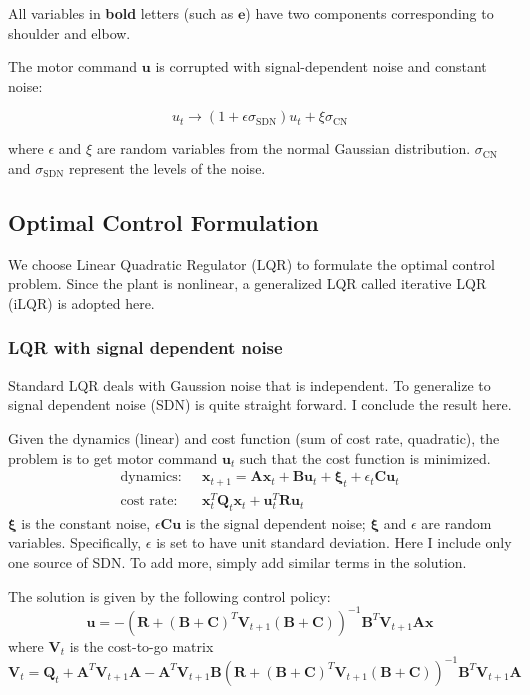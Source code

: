 All variables in \textbf{bold} letters (such as $\bm{e}$) have two components corresponding to shoulder and elbow.

The motor command $\bm{u}$ is corrupted with signal-dependent noise and constant noise:

\begin{equation}
u_t \rightarrow (1 + \epsilon\sigma_{\text{SDN}}) u_t + \xi\sigma_{\text{CN}}
\end{equation}

where $\epsilon$ and $\xi$ are random variables from the normal Gaussian distribution.
$\sigma_{\text{CN}}$ and $\sigma_{\text{SDN}}$ represent the levels of the noise.

\subsection{Optimal Control Formulation}
\label{ocformulation}

We choose Linear Quadratic Regulator (LQR) \cite{todorov2006optimal} to formulate the optimal control problem. Since the plant is nonlinear, a generalized LQR called iterative LQR (iLQR) is adopted here.

\subsubsection{LQR with signal dependent noise}
Standard LQR deals with Gaussion noise that is independent. To generalize to signal dependent noise (SDN) is quite straight forward. I conclude the result here.

Given the dynamics (linear) and cost function (sum of cost rate, quadratic), the problem is to get motor command $\bm{u}_t$ such that the cost function is minimized.
\begin{equation}\label{optimprob}
\begin{split}
\text{dynamics:~~} & \bm{x}_{t+1} = \bm{Ax}_t + \bm{Bu}_t + \bm{\xi}_t + \epsilon_t\bm{Cu}_t \\
\text{cost rate:~~} & \bm{x}_t^T\bm{Q}_t\bm{x}_t + \bm{u}_t^T\bm{Ru}_t
\end{split}
\end{equation}
$\bm{\xi}$ is the constant noise, $\epsilon\bm{Cu}$ is the signal dependent noise; $\bm{\xi}$ and $\epsilon$ are random variables. Specifically, $\epsilon$ is set to have unit standard deviation. Here I include only one source of SDN. To add more, simply add similar terms in the solution.

The solution is given by the following control policy:
\begin{equation}
\bm{u} = -(\bm{R}+(\bm{B+C})^T\bm{V}_{t+1}(\bm{B+C}) )^{-1} \bm{B}^T\bm{V}_{t+1}\bm{Ax}
\end{equation}
where $\bm{V}_t$ is the cost-to-go matrix 
\begin{equation}
\bm{V}_t = \bm{Q}_t + \bm{A}^T\bm{V}_{t+1}\bm{A} - \bm{A}^T\bm{V}_{t+1}\bm{B}(\bm{R} + (\bm{B+C})^T\bm{V}_{t+1}(\bm{B+C}))^{-1}\bm{B}^T\bm{V}_{t+1}\bm{A}
\end{equation}

